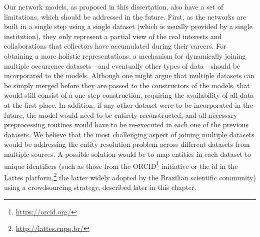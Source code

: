 Our network models, as proposed in this dissertation, also have a set of limitations, which should be addressed in the future.
First, as the networks are built in a single step using a single dataset (which is usually provided by a single institution), they only represent a partial view of the real interests and collaborations that collectors have accumulated during their careers.
For obtaining a more holistic representations, a mechanism for dynamically joining multiple occurrence datasets---and eventually other types of data---should be incorporated to the models.
Although one might argue that multiple datasets can be simply merged before they are passed to the constructors of the models, that would still consist of a one-step construction, requiring the availability of all data at the first place.
In addition, if any other dataset were to be incorporated in the future, the model would need to be entirely reconstructed, and all necessary preprocessing routines would have to be re-executed in each one of the previous datasets.
%
We believe that the most challenging aspect of joining multiple datasets would be addressing the entity resolution problem across different datasets from multiple sources. A possible solution would be to map entities in each dataset to unique identifiers (such as those from the ORCID\footnote{\url{https://orcid.org/}} initiative or the id in the Lattes platform,\footnote{\url{http://lattes.cnpq.br/}} the latter widely adopted by the Brazilian scientific community) using a crowdsourcing strategy, described later in this chapter.

